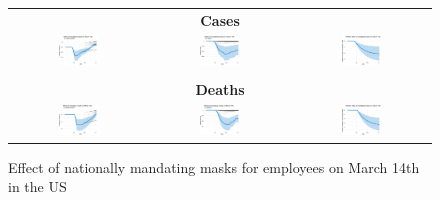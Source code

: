 \documentclass[11pt,reqno,letter]{amsart}
\theoremstyle{definition}
\begin{document}
\begin{figure}[ht]
  \caption{Effect of nationally mandating masks for employees on March
    14th in the US\label{fig:US-mask}}
  \begin{minipage}{\linewidth}
    \centering
    \medskip
    \begin{tabular}{ccc}
      \multicolumn{3}{c}{\textbf{Cases}} \\
      \includegraphics[width=0.31\textwidth]{tables_and_figures/us-mask-dgrowth_idx}
      &
        \includegraphics[width=0.31\textwidth]{tables_and_figures/us-mask-dcases_idx}
      &
        \includegraphics[width=0.31\textwidth]{tables_and_figures/us-mask-rcumu_idx}
      \\
      \\
      \multicolumn{3}{c}{\textbf{Deaths}} \\
      \includegraphics[width=0.31\textwidth]{tables_and_figures/us-mask-dgrowth_deaths_idx}
      &
        \includegraphics[width=0.31\textwidth]{tables_and_figures/us-mask-dcases_deaths_idx}
     &
        \includegraphics[width=0.31\textwidth]{tables_and_figures/us-mask-rcumu_deaths_idx}
    \end{tabular}


\end{minipage}
\end{figure}
\end{document}
